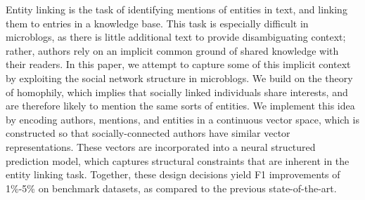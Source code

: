 Entity linking is the task of identifying mentions of entities in text, and linking them to entries in a knowledge base. This task is especially difficult in microblogs, as there is little additional text to provide disambiguating context; rather, authors rely on an implicit common ground of shared knowledge with their readers. In this paper, we attempt to capture some of this implicit context by exploiting the social network structure in microblogs. We build on the theory of homophily, which implies that socially linked individuals share interests, and are therefore likely to mention the same sorts of entities. We implement this idea by encoding authors, mentions, and entities in a continuous vector space, which is constructed so that socially-connected authors have similar vector representations. These vectors are incorporated into a neural structured prediction model, which captures structural constraints that are inherent in the entity linking task. Together, these design decisions yield F1 improvements of 1\%-5\% on benchmark datasets, as compared to the previous state-of-the-art.
